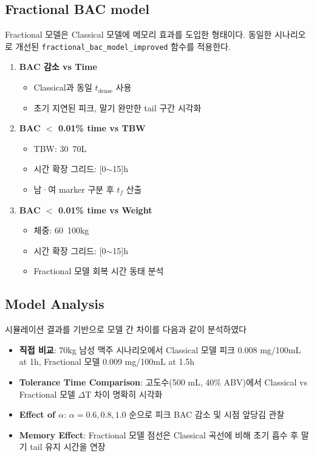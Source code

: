 \documentclass[11pt]{article}
\begin{document}
\subsection{Fractional BAC model}\label{fractional_bac}
Fractional 모델은 Classical 모델에 메모리 효과를 도입한 형태이다. 동일한 시나리오로 개선된 \texttt{fractional\_bac\_model\_improved} 함수를 적용한다.
\begin{enumerate}
  \item \textbf{BAC 감소 vs Time}\
    \begin{itemize}
      \item Classical과 동일 $t_{\mathrm{dense}}$ 사용
      \item 초기 지연된 피크, 말기 완만한 tail 구간 시각화
    \end{itemize}

  \item \textbf{BAC $<$ 0.01\% time vs TBW}\
    \begin{itemize}
      \item TBW: 30~70L
      \item 시간 확장 그리드: [0$\sim$15]h
      \item 남·여 marker 구분 후 $t_f$ 산출
    \end{itemize}

  \item \textbf{BAC $<$ 0.01\% time vs Weight}\
    \begin{itemize}
      \item 체중: 60~100kg
      \item 시간 확장 그리드: [0$\sim$15]h
      \item Fractional 모델 회복 시간 동태 분석
    \end{itemize}
\end{enumerate}

\subsection{Model Analysis}
시뮬레이션 결과를 기반으로 모델 간 차이를 다음과 같이 분석하였다
\begin{itemize}
  \item \textbf{직접 비교}: 70kg 남성 맥주 시나리오에서 Classical 모델 피크 0.008 mg/100mL at 1h, Fractional 모델 0.009 mg/100mL at 1.5h
  \item \textbf{Tolerance Time Comparison}: 고도수(500 mL, 40\% ABV)에서 Classical vs Fractional 모델 $\Delta$T 차이 명확히 시각화
  \item \textbf{Effect of $\alpha$}: $\alpha=0.6,0.8,1.0$ 순으로 피크 BAC 감소 및 시점 앞당김 관찰
  \item \textbf{Memory Effect}: Fractional 모델 점선은 Classical 곡선에 비해 초기 흡수 후 말기 tail 유지 시간을 연장
\end{itemize}
\end{document}
